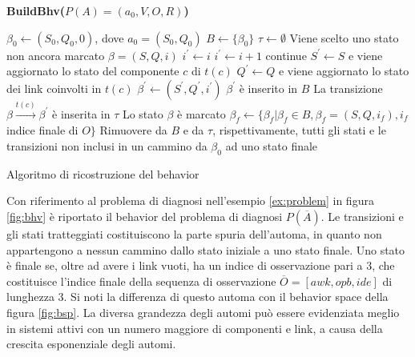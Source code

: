 \begin{algorithm}
\textbf{BuildBhv($P(A) = (a_0,V,O,R)$)}
\begin{algorithmic}
	\STATE $\beta_0 \leftarrow (S_0,Q_0,0)$, dove $a_0 = (S_0,Q_0)$
	\STATE $B \leftarrow \{\beta_0\}$
	\STATE $\tau \leftarrow \emptyset$
	\REPEAT
		\STATE Viene scelto uno stato non ancora marcato $\beta = (S,Q,i)$
				\STATE $i^\prime \leftarrow i$
				\STATE $i^\prime \leftarrow i+1$
			\ELSE
				\STATE continue
			\ENDIF
			\STATE $S^\prime \leftarrow S$ e viene aggiornato lo stato del componente $c$ di $t(c)$
			\STATE $Q^\prime \leftarrow Q$ e viene aggiornato lo stato dei link coinvolti in $t(c)$
			\STATE $\beta^\prime \leftarrow (S^\prime,Q^\prime,i^\prime)$
				\STATE $\beta^\prime$ è inserito in $B$
			\ENDIF
			\STATE La transizione $\beta \xrightarrow{t(c)} \beta^\prime$ è inserita in $\tau$
		\ENDFOR
		\STATE Lo stato $\beta$ è marcato
	\STATE $\beta_f \leftarrow \{\beta_f | \beta_f \in B, \beta_f=(S,Q,i_f), i_f$  indice finale di $O\}$
	\STATE Rimuovere da $B$ e da $\tau$, rispettivamente, tutti gli stati e le transizioni non inclusi in un cammino da $\beta_0$ ad uno stato finale
\end{algorithmic}
\caption{Algoritmo di ricostruzione del behavior}
\label{alg:bhv}
\end{algorithm}

\begin{ex}
Con riferimento al problema di diagnosi nell'esempio \ref{ex:problem} in figura \ref{fig:bhv} è riportato  il behavior del problema di diagnosi $P(\overline{A})$. Le transizioni e gli stati tratteggiati costituiscono la parte spuria dell'automa, in quanto non appartengono a nessun cammino dallo stato iniziale a uno stato finale. Uno stato è finale se, oltre ad avere i link vuoti, ha un indice di osservazione pari a $3$, che costituisce l'indice finale della sequenza di osservazione $\overline{O} = [awk,opb,ide]$ di lunghezza $3$.
Si noti la differenza di questo automa con il behavior space della figura \ref{fig:bsp}. 
La diversa grandezza degli automi può essere evidenziata meglio in sistemi attivi con un numero maggiore di componenti e link, a causa della crescita esponenziale degli automi.
\end{ex}

